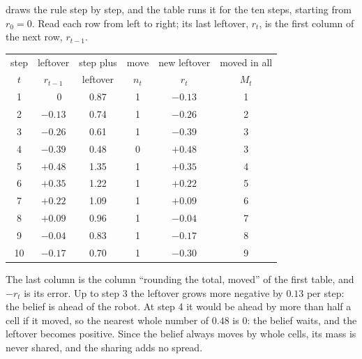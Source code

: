  draws the rule step by step, and the table runs
it for the ten steps, starting from $r_0=0$. Read
each row from left to right; its last leftover, $r_t$, is the first
column of the next row, $r_{t-1}$.
\begin{center}
\begin{tabular}{cccccc}
  \toprule
  step & leftover & step plus & move & new leftover & moved in all\\
  $t$ & $r_{t-1}$ & leftover & $n_t$ & $r_t$ & $M_t$\\
  \midrule
  1  & $\phantom{+}0$ & 0.87 & 1 & $-0.13$ & 1\\
  2  & $-0.13$ & 0.74 & 1 & $-0.26$ & 2\\
  3  & $-0.26$ & 0.61 & 1 & $-0.39$ & 3\\
  4  & $-0.39$ & 0.48 & 0 & $+0.48$ & 3\\
  5  & $+0.48$ & 1.35 & 1 & $+0.35$ & 4\\
  6  & $+0.35$ & 1.22 & 1 & $+0.22$ & 5\\
  7  & $+0.22$ & 1.09 & 1 & $+0.09$ & 6\\
  8  & $+0.09$ & 0.96 & 1 & $-0.04$ & 7\\
  9  & $-0.04$ & 0.83 & 1 & $-0.17$ & 8\\
  10 & $-0.17$ & 0.70 & 1 & $-0.30$ & 9\\
  \bottomrule
\end{tabular}
\end{center}
The last column is the column ``rounding the total, moved'' of the first
table, and $-r_t$ is its error. Up to step 3 the leftover grows more
negative by $0.13$ per step: the belief is ahead of the robot. At step 4
it would be ahead by more than half a cell if it moved, so the nearest
whole number of $0.48$ is $0$: the belief waits, and the leftover becomes
positive. Since the belief always moves by whole cells, its mass is never
shared, and the sharing adds no spread.
